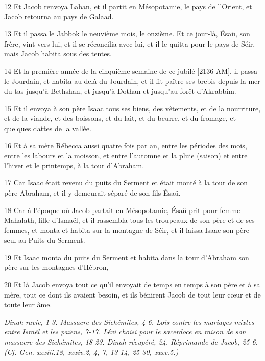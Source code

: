\par 12 Et Jacob renvoya Laban, et il partit en Mésopotamie, le pays de l'Orient, et Jacob retourna au pays de Galaad.
\par 13 Et il passa le Jabbok le neuvième mois, le onzième. Et ce jour-là, Ésaü, son frère, vint vers lui, et il se réconcilia avec lui, et il le quitta pour le pays de Séir, mais Jacob habita sous des tentes.
\par 14 Et la première année de la cinquième semaine de ce jubilé [2136 AM], il passa le Jourdain, et habita au-delà du Jourdain, et il fit paître ses brebis depuis la mer du tas jusqu'à Bethshan, et jusqu'à Dothan et jusqu'au forêt d'Akrabbim.
\par 15 Et il envoya à son père Isaac tous ses biens, des vêtements, et de la nourriture, et de la viande, et des boissons, et du lait, et du beurre, et du fromage, et quelques dattes de la vallée.
\par 16 Et à sa mère Rébecca aussi quatre fois par an, entre les périodes des mois, entre les labours et la moisson, et entre l'automne et la pluie (saison) et entre l'hiver et le printemps, à la tour d'Abraham.
\par 17 Car Isaac était revenu du puits du Serment et était monté à la tour de son père Abraham, et il y demeurait séparé de son fils Ésaü.
\par 18 Car à l'époque où Jacob partait en Mésopotamie, Ésaü prit pour femme Mahalath, fille d'Ismaël, et il rassembla tous les troupeaux de son père et de ses femmes, et monta et habita sur la montagne de Séir, et il laissa Isaac son père seul au Puits du Serment.
\par 19 Et Isaac monta du puits du Serment et habita dans la tour d'Abraham son père sur les montagnes d'Hébron,
\par 20 Et là Jacob envoya tout ce qu'il envoyait de temps en temps à son père et à sa mère, tout ce dont ils avaient besoin, et ils bénirent Jacob de tout leur cœur et de toute leur âme.


\par \textit{Dinah ravie, 1-3. Massacre des Sichémites, 4-6. Lois contre les mariages mixtes entre Israël et les païens, 7-17. Lévi choisi pour le sacerdoce en raison de son massacre des Sichémites, 18-23. Dinah récupéré, 24. Réprimande de Jacob, 25-6. (Cf. Gen. xxxiii.18, xxxiv.2, 4, 7, 13-14, 25-30, xxxv.5.)}

